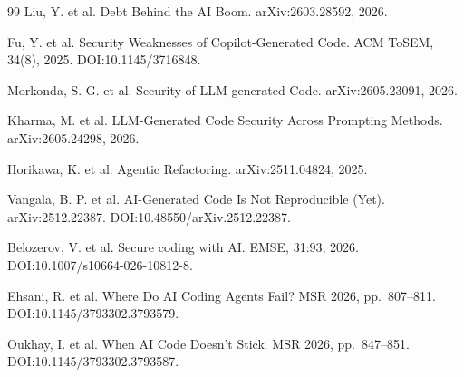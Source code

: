 \documentclass[10pt,twocolumn]{article}
\begin{document}
\begin{thebibliography}{99}
 Liu, Y. et al. Debt Behind the AI Boom. arXiv:2603.28592, 2026.

 Fu, Y. et al. Security Weaknesses of Copilot-Generated Code. ACM ToSEM, 34(8), 2025. DOI:10.1145/3716848.

 Morkonda, S. G. et al. Security of LLM-generated Code. arXiv:2605.23091, 2026.

 Kharma, M. et al. LLM-Generated Code Security Across Prompting Methods. arXiv:2605.24298, 2026.

 Horikawa, K. et al. Agentic Refactoring. arXiv:2511.04824, 2025.

 Vangala, B. P. et al. AI-Generated Code Is Not Reproducible (Yet). arXiv:2512.22387. DOI:10.48550/arXiv.2512.22387.

 Belozerov, V. et al. Secure coding with AI. EMSE, 31:93, 2026. DOI:10.1007/s10664-026-10812-8.

 Ehsani, R. et al. Where Do AI Coding Agents Fail? MSR 2026, pp.\ 807--811. DOI:10.1145/3793302.3793579.

 Oukhay, I. et al. When AI Code Doesn't Stick. MSR 2026, pp.\ 847--851. DOI:10.1145/3793302.3793587.

\end{thebibliography}
\end{document}
